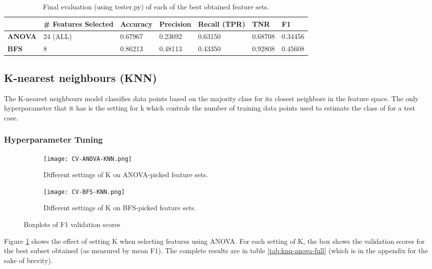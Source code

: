 \documentclass{article}
\begin{document}
\begin{table}[H]
\centering
\caption{Final evaluation (using tester.py) of each of the best obtained feature sets.}
\label{my-label}
\begin{tabular}{|l|l|l|l|l|l|l|}
\hline
               & \textbf{\# Features Selected} & \textbf{Accuracy} & \textbf{Precision} & \textbf{Recall (TPR)} & \textbf{TNR} & \textbf{F1} \\ \hline
\textbf{ANOVA} & 24 (ALL)                      & 0.67967           & 0.23692            & 0.63150               & 0.68708      & 0.34456     \\ \hline
\textbf{BFS}   & 8                             & 0.86213           & 0.48113            & 0.43350               & 0.92808      & 0.45608     \\ \hline
\end{tabular}
\end{table}
\subsection{K-nearest neighbours (KNN)}

The K-nearest neighbours model classifies data points based on the majority class for its closest neighbors in the feature space. The only hyperparameter that it has is the setting for k which controls the number of training data points used to estimate the class of for a test case. 

\subsubsection{Hyperparameter Tuning}

\begin{figure}[H]
    \centering
    \begin{subfigure}[t]{0.49\linewidth}
        \texttt{[image: CV-ANOVA-KNN.png]}
        \caption{Different settings of K on ANOVA-picked feature sets.}%
        \label{fig:knn-anova-k}
    \end{subfigure}
    \centering
    \begin{subfigure}[t]{0.49\linewidth}
        \texttt{[image: CV-BFS-KNN.png]}
        \caption{Different settings of K on BFS-picked feature sets.}
        \label{fig:knn-bfs}
    \end{subfigure} 
    \caption{Boxplots of F1 validation scores}
\end{figure}


Figure \ref{fig:knn-anova-k} shows the effect of setting K when selecting features using ANOVA. For each setting of K, the box shows the validation scores for the best subset obtained (as measured by mean F1). The complete results are in table \ref{tab:knn-anova-full} (which is in the appendix for the sake of brevity).
\end{document}
